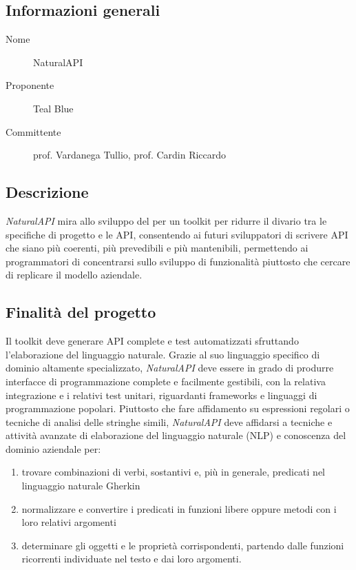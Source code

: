 \documentclass[../studio-di-fattibilita.tex]{subfiles}
\begin{document}
  \subsection{Informazioni generali}%
  \label{subsec:informazioni_generali}
  \begin{description}
    \item[Nome] NaturalAPI
    \item[Proponente] Teal Blue
    \item[Committente] prof. Vardanega Tullio, prof. Cardin Riccardo
  \end{description}


  \subsection{Descrizione}%
  \label{subsec:descrizione}
  \textit{NaturalAPI} mira allo sviluppo del  per un toolkit per ridurre il divario tra le specifiche di progetto e le API, consentendo ai futuri sviluppatori di scrivere API che siano più coerenti, più prevedibili e più mantenibili, permettendo ai programmatori di concentrarsi sullo sviluppo di funzionalità piuttosto che cercare di replicare il modello aziendale.


  \subsection{Finalità del progetto}%
  \label{subsec:finalita_del_progetto}
  Il toolkit deve generare API complete e test automatizzati sfruttando l'elaborazione del linguaggio naturale.
  Grazie al suo linguaggio specifico di dominio altamente specializzato, \textit{NaturalAPI} deve essere in grado di produrre interfacce di programmazione complete e facilmente gestibili, con la relativa integrazione e i relativi test unitari, riguardanti frameworks e linguaggi di programmazione popolari.
  Piuttosto che fare affidamento su espressioni regolari o tecniche di analisi delle stringhe simili, \textit{NaturalAPI} deve affidarsi a tecniche e attività avanzate di elaborazione del linguaggio naturale (NLP) e conoscenza del dominio aziendale per:
    \begin{enumerate}
      \item trovare combinazioni di verbi, sostantivi e, più in generale, predicati nel linguaggio naturale Gherkin
      \item normalizzare e convertire i predicati in funzioni libere oppure metodi con i loro relativi argomenti
      \item determinare gli oggetti e le proprietà corrispondenti, partendo dalle funzioni ricorrenti individuate nel testo e dai loro argomenti.
    \end{enumerate}
\end{document}
